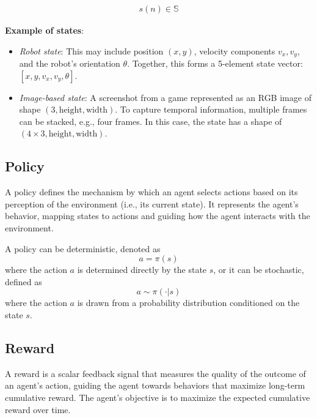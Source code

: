 \documentclass[12pt,twoside,onecolumn,openany,extrafontsizes,dvipsnames]{memoir}
\begin{document}
    \begin{align}
        s(n) \in \mathbb{S}
    \end{align}

    \textbf{Example of states}:
    \begin{itemize}
        \item \textit{Robot state}: This may include position $(x, y)$, velocity components $v_x, v_y$, and the robot's orientation $\theta$. 
        Together, this forms a 5-element state vector: $[x, y, v_x, v_y, \theta]$.
        
        \item \textit{Image-based state}: A screenshot from a game represented as an RGB image of shape $(3, \text{height}, \text{width})$. To capture temporal information, multiple frames can be stacked, e.g., four frames. In this case, the state has a shape of $(4 \times 3, \text{height}, \text{width})$.
    \end{itemize}
    
    \subsection{Policy}
    A policy defines the mechanism by which an agent selects actions based on its perception of the environment (i.e., its current state). 
    It represents the agent's behavior, mapping states to actions and guiding how the agent interacts with the environment.
    
    A policy can be deterministic, denoted as
    \[
    a = \pi(s)
    \]
    where the action \( a \) is determined directly by the state \( s \), or it can be stochastic, defined as
    \[
    a \sim \pi(\cdot | s)
    \]
    where the action \( a \) is drawn from a probability distribution conditioned on the state \( s \).
    

    \subsection{Reward}
    A reward is a scalar feedback signal that measures the quality of the outcome of an agent's action, guiding the agent towards behaviors that maximize long-term cumulative reward. 
    The agent's objective is to maximize the expected cumulative reward over time.
    
\end{document}
